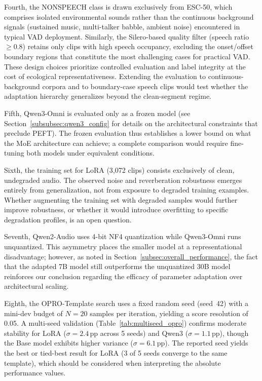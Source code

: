 \documentclass[11pt,a4paper]{article}
\begin{document}
Fourth, the NONSPEECH class is drawn exclusively from ESC-50, which comprises isolated
environmental sounds rather than the continuous background signals (sustained music,
multi-talker babble, ambient noise) encountered in typical VAD deployment. Similarly, the
Silero-based quality filter (speech ratio $\geq 0.8$) retains only clips with high speech
occupancy, excluding the onset/offset boundary regions that constitute the most challenging
cases for practical VAD. These design choices prioritize controlled evaluation and label
integrity at the cost of ecological representativeness. Extending the evaluation to
continuous-background corpora and to boundary-case speech clips would test whether the
adaptation hierarchy generalizes beyond the clean-segment regime.

Fifth, Qwen3-Omni is evaluated only as a frozen model (see Section~\ref{subsubsec:qwen3_config}
for details on the architectural constraints that preclude PEFT).
The frozen evaluation thus establishes a lower bound on what the MoE architecture can achieve;
a complete comparison would require fine-tuning both models under equivalent conditions.

Sixth, the training set for LoRA (3{,}072 clips) consists exclusively of clean, undegraded audio. The observed noise and reverberation robustness emerges entirely from generalization, not from exposure to degraded training examples. Whether augmenting the training set with degraded samples would further improve robustness, or whether it would introduce overfitting to specific degradation profiles, is an open question.

Seventh, Qwen2-Audio uses 4-bit NF4 quantization while Qwen3-Omni runs unquantized. This asymmetry places the smaller model at a representational disadvantage; however, as noted in Section~\ref{subsec:overall_performance}, the fact that the adapted 7B model still outperforms the unquantized 30B model reinforces our conclusion regarding the efficacy of parameter adaptation over architectural scaling.

Eighth, the OPRO-Template search uses a fixed random seed (seed~42) with a mini-dev budget of $N = 20$ samples per iteration, yielding a score resolution of 0.05. A multi-seed validation (Table~\ref{tab:multiseed_opro}) confirms moderate stability for LoRA ($\sigma = 2.4$\,pp across 5 seeds) and Qwen3 ($\sigma = 1.1$\,pp), though the Base model exhibits higher variance ($\sigma = 6.1$\,pp). The reported seed yields the best or tied-best result for LoRA (3 of 5 seeds converge to the same template), which should be considered when interpreting the absolute performance values.
\end{document}
